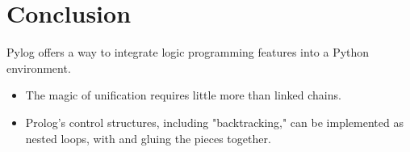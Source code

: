 \section{Conclusion}
  Pylog offers a way to integrate logic programming features into a Python environment.
  
  \begin{itemize}
  \item The magic of unification requires little more than linked chains.
  \item Prolog's control structures, including "backtracking," can be implemented as nested  loops, with  and  gluing the pieces together.
\end{itemize}
